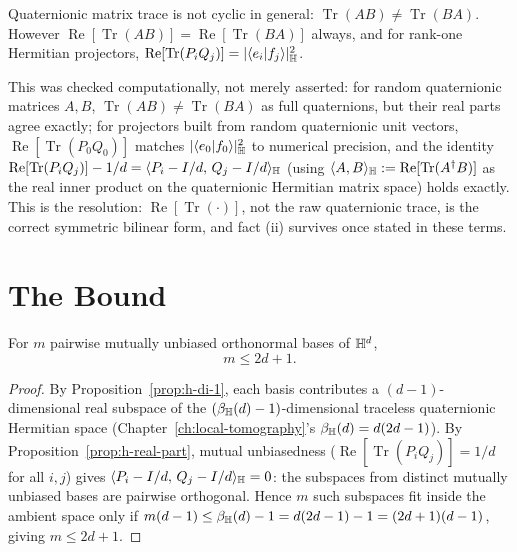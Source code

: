\begin{proposition}
\label{prop:h-real-part}
Quaternionic matrix trace is not cyclic in general: $\operatorname{Tr}(AB)
\ne \operatorname{Tr}(BA)$. However $\operatorname{Re}[\operatorname{Tr}(AB)]
= \operatorname{Re}[\operatorname{Tr}(BA)]$ always, and for rank-one
Hermitian projectors, $\operatorname{Re}[\operatorname{Tr}(P_iQ_j)] =
|\langle e_i|f_j\rangle|_{\mathbb{H}}^2$.
\end{proposition}

This was checked computationally, not merely asserted: for random
quaternionic matrices $A,B$, $\operatorname{Tr}(AB)\ne\operatorname{Tr}(BA)$
as full quaternions, but their real parts agree exactly; for projectors
built from random quaternionic unit vectors, $\operatorname{Re}[\operatorname{Tr}(P_0Q_0)]$
matches $|\langle e_0|f_0\rangle|_{\mathbb{H}}^2$ to numerical precision, and the
identity $\operatorname{Re}[\operatorname{Tr}(P_iQ_j)] - 1/d =
\langle P_i-I/d,\,Q_j-I/d\rangle_{\mathbb{H}}$ (using
$\langle A,B\rangle_{\mathbb{H}} := \operatorname{Re}[\operatorname{Tr}(A^\dagger
B)]$ as the real inner product on the quaternionic Hermitian matrix space)
holds exactly. This is the resolution: $\operatorname{Re}[\operatorname{Tr}
(\cdot)]$, not the raw quaternionic trace, is the correct symmetric
bilinear form, and fact (ii) survives once stated in these terms.

\section{The Bound}

\begin{theorem}
\label{thm:h-mub-bound}
For $m$ pairwise mutually unbiased orthonormal bases of $\mathbb{H}^d$,
\begin{equation}
m \le 2d+1.
\end{equation}
\end{theorem}

\begin{proof}
By Proposition~\ref{prop:h-di-1}, each basis contributes a $(d-1)$-dimensional
real subspace of the $(\beta_{\mathbb{H}}(d)-1)$-dimensional traceless quaternionic
Hermitian space (Chapter~\ref{ch:local-tomography}'s $\beta_{\mathbb{H}}(d) =
d(2d-1)$). By Proposition~\ref{prop:h-real-part}, mutual unbiasedness
($\operatorname{Re}[\operatorname{Tr}(P_iQ_j)]=1/d$ for all $i,j$) gives
$\langle P_i-I/d,\,Q_j-I/d\rangle_{\mathbb{H}} = 0$: the subspaces from distinct
mutually unbiased bases are pairwise orthogonal. Hence $m$ such subspaces
fit inside the ambient space only if $m(d-1) \le \beta_{\mathbb{H}}(d)-1 =
d(2d-1)-1 = (2d+1)(d-1)$, giving $m \le 2d+1$.
\end{proof}

